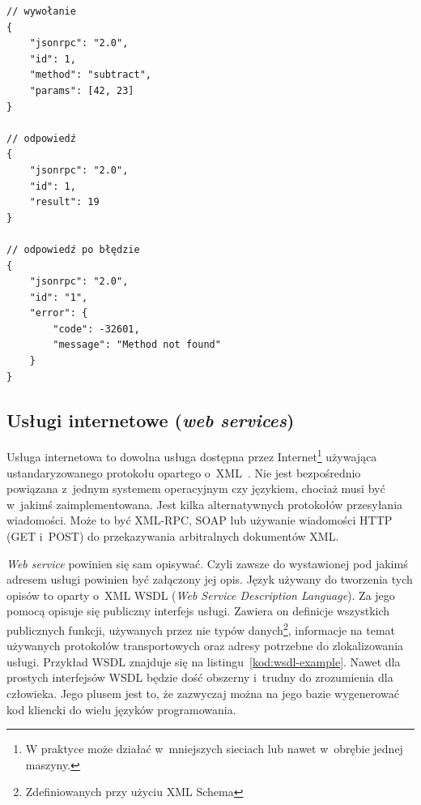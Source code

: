 \begin{lstlisting}[float, frame=single, caption={Przykłady wiadomości w~JSON-RPC.}, label=kod:json-rpc-examples]
// wywołanie
{
	"jsonrpc": "2.0",
	"id": 1,
	"method": "subtract",
	"params": [42, 23]
}

// odpowiedź
{
	"jsonrpc": "2.0",
	"id": 1,
	"result": 19
}

// odpowiedź po błędzie
{
	"jsonrpc": "2.0",
	"id": "1",
	"error": {
		"code": -32601,
		"message": "Method not found"
	}
}
\end{lstlisting}


\subsection{Usługi internetowe (\emph{web services})}
Usługa internetowa to dowolna usługa dostępna przez Internet\footnote{W praktyce może działać w~mniejszych sieciach lub nawet w~obrębie jednej maszyny.} używająca ustandaryzowanego protokołu opartego o~XML~\cite{web-services}.
Nie jest bezpośrednio powiązana z~jednym systemem operacyjnym czy językiem, chociaż musi być w~jakimś zaimplementowana.
Jest kilka alternatywnych protokołów przesyłania wiadomości. Może to być XML-RPC, SOAP lub używanie wiadomości HTTP (GET i~POST) do przekazywania  arbitralnych dokumentów XML.

\emph{Web service} powinien się sam opisywać. Czyli zawsze do wystawionej pod jakimś adresem usługi powinien być załączony jej opis.
Język używany do tworzenia tych opisów to oparty o~XML WSDL (\emph{Web Service Description Language}).
Za jego pomocą opisuje się publiczny interfejs usługi. Zawiera on definicje wszystkich publicznych funkcji, używanych przez nie typów danych\footnote{Zdefiniowanych przy użyciu XML Schema}, informacje na temat używanych protokołów transportowych oraz adresy potrzebne do zlokalizowania usługi. Przykład WSDL znajduje się na listingu~\ref{kod:wsdl-example}. Nawet dla prostych interfejsów WSDL będzie dość obszerny i~trudny do zrozumienia dla człowieka.
Jego plusem jest to, że zazwyczaj można na jego bazie wygenerować kod kliencki do wielu języków programowania.

